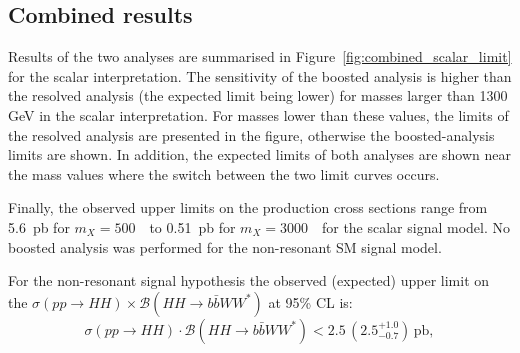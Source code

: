 \subsection{Combined results}
Results of the two analyses are summarised in Figure~\ref{fig:combined_scalar_limit} for the scalar interpretation.
The sensitivity of the boosted analysis is higher than the resolved
analysis (the expected limit being lower)  for masses larger  than 1300 GeV in the scalar interpretation.
For masses lower than these values, the limits of the resolved analysis are presented in the figure, otherwise the boosted-analysis limits are shown.
In addition, the expected limits of both analyses are shown near the mass values where the switch between the two limit curves occurs.

Finally, the observed upper limits on the production cross sections range from 5.6~pb  for $m_X=500$~\GeV\ to 0.51~pb for
$m_X=3000$~\GeV\ for the scalar signal model. No boosted analysis was
performed for the non-resonant SM signal model.
 
For the non-resonant signal hypothesis the observed (expected) upper
limit on the $\sigma(pp \to HH) \times {\mathcal{B}}(HH \to b\bar{b}WW^{\ast})$ at 95\%
CL is:
\[
\sigma(pp \to HH) \cdot {\mathcal{B}}(HH \to b\bar{b}WW^{\ast}) < 2.5 \, \left
 (2.5^{+1.0}_{-0.7} \right )  \,
{\mathrm{pb}},
\]
 
